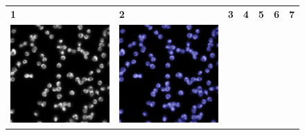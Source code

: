 \begin{figure}[H]
    \centering
    \centering
        \begin{tabularx}{\textwidth}{YYYYYYY}
            \textbf{1} &
            \textbf{2} &
            \textbf{3} &
            \textbf{4} &
            \textbf{5} &
            \textbf{6} &
            \textbf{7} \\
            \includegraphics{bilder/ER/segmentation/pp_1.png} & \includegraphics{bilder/ER/segmentation/pp_2.png} &

\end{tabularx}
\end{figure}
